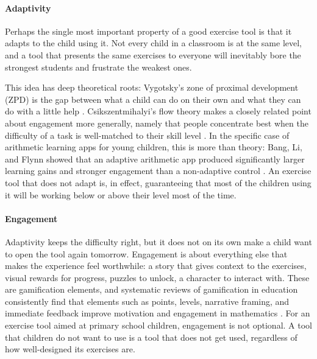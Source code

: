 \paragraph{Adaptivity}
Perhaps the single most important property of a good exercise tool is that it adapts to the child using it. Not every child in a classroom is at the same level, and a tool that presents the same exercises to everyone will inevitably bore the strongest students and frustrate the weakest ones. 

This idea has deep theoretical roots: Vygotsky's zone of proximal development (ZPD) is the gap between what a child can do on their own and what they can do with a little help \cite{vygotsky1978mind}. Csikszentmihalyi's flow theory makes a closely related point about engagement more generally, namely that people concentrate best when the difficulty of a task is well-matched to their skill level \cite{csikszentmihalyi1990flow}. In the specific case of arithmetic learning apps for young children, this is more than theory: Bang, Li, and Flynn showed that an adaptive arithmetic app produced significantly larger learning gains and stronger engagement than a non-adaptive control \cite{bang2023mymathacademy}. An exercise tool that does not adapt is, in effect, guaranteeing that most of the children using it will be working below or above their level most of the time.

\paragraph{Engagement}
Adaptivity keeps the difficulty right, but it does not on its own make a child want to open the tool again tomorrow. Engagement is about everything else that makes the experience feel worthwhile: a story that gives context to the exercises, visual rewards for progress, puzzles to unlock, a character to interact with. These are gamification elements, and systematic reviews of gamification in education consistently find that elements such as points, levels, narrative framing, and immediate feedback improve motivation and engagement in mathematics \cite{manzanoleon2021gamification}. For an exercise tool aimed at primary school children, engagement is not optional. A tool that children do not want to use is a tool that does not get used, regardless of how well-designed its exercises are.

